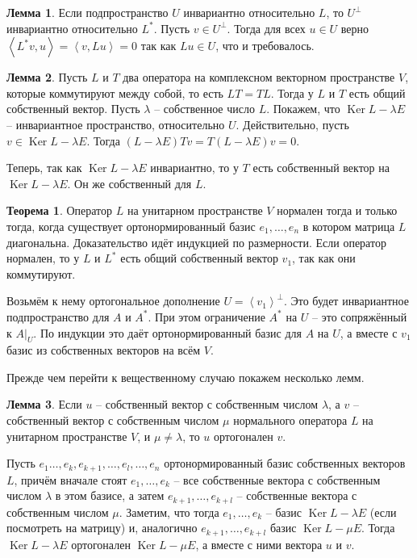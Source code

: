 \documentclass[10pt,a4paper,oneside]{book} %
\theoremstyle{definition}
\newtheorem{thm}{Теорема}
\newtheorem{lem}{Лемма}
\DeclareMathOperator{\Ker}{Ker}
\def\lan{\left\langle }
\def\ran{\right\rangle}
\def\thrm{\begin{thm}}
\def\ethrm{\end{thm}}
\def\lm{\begin{lem}}
\def\elm{\end{lem}}
\begin{document}
\lm Если подпространство $U$ инвариантно относительно $L$, то $U^{\bot}$ инвариантно относительно $L^{*}$.
\proof Пусть $v\in U^{\bot}$. Тогда для всех $u\in U$ верно $\lan L^* v, u\ran = \lan v, Lu\ran =0 $ так как $Lu\in U$, что и требовалось.
\endproof
\elm

\lm Пусть $L$ и $T$ два оператора на комплексном векторном пространстве $V$, которые коммутируют между собой, то есть $LT=TL$. Тогда у $L$ и $T$ есть общий собственный вектор. 
\proof Пусть $\lambda$ -- собственное число $L$. Покажем, что $\Ker L -\lambda E$ -- инвариантное пространство, относительно $U$. Действительно, пусть $v\in \Ker L-\lambda E$. Тогда $(L-\lambda E)Tv=T(L-\lambda E)v=0$.

Теперь, так как $\Ker L-\lambda E$ инвариантно, то у $T$ есть собственный вектор на $\Ker L-\lambda E$. Он же собственный для $L$.
\endproof
\elm

\thrm 
Оператор $L$ на  унитарном пространстве $V$ нормален тогда и только тогда, когда существует ортонормированный базис $e_1,\dots,e_n$ в котором матрица $L$ диагональна.
\proof
Доказательство идёт индукцией по размерности. Если оператор нормален, то у $L$ и $L^*$ есть общий собственный вектор $v_1$, так как они коммутируют.

Возьмём к нему ортогональное дополнение $U=\lan v_1\ran^{\bot}$. Это будет инвариантное подпространство для $A$ и $A^*$. При этом ограничение $A^*$ на $U$ -- это сопряжённый к $A|_U$. По индукции это даёт ортонормированный базис для $A$ на $U$, а вместе с $v_1$ базис из собственных векторов на всём $V$.
\endproof
\ethrm


Прежде чем перейти к вещественному случаю покажем несколько лемм.

\lm Если $u$ -- собственный вектор с собственным числом $\lambda$, а $v$ -- собственный вектор с собственным числом $\mu$ нормального оператора $L$ на унитарном пространстве $V$, и $\mu\neq \lambda$, то $u$ ортогонален $v$. 
\elm
\proof Пусть $e_1\dots,e_k, e_{k+1},\dots,e_l, \dots,e_n$ ортонормированный базис собственных векторов $L$, причём вначале стоят  $e_1,\dots,e_k$ -- все собственные вектора с собственным числом $\lambda$ в этом базисе, а затем $e_{k+1},\dots,e_{k+l}$ -- собственные вектора с собственным числом $\mu$. Заметим, что тогда $e_1,\dots,e_k$ -- базис $\Ker L - \lambda E$ (если посмотреть на матрицу) и, аналогично $e_{k+1},\dots,e_{k+l}$ базис $\Ker L- \mu E$. Тогда  $\Ker L - \lambda E$ ортогонален $\Ker L- \mu E$, а вместе с ними вектора $u$ и $v$.
\endproof
\end{document}
